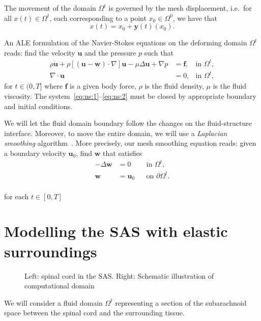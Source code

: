 \documentclass[11pt,a4paper,titlepage]{report}
\begin{document}
The movement of the domain $\Omega^t$ is governed by the mesh
displacement, i.e.~for all $x(t) \in \Omega^t$, each corresponding to
a point $x_0 \in \Omega^0$, we have that
\begin{equation}
  x(t) = x_0 + \mathbf{y}(t)(x_0).
\end{equation}

An ALE formulation of the Navier-Stokes equations on the deforming
domain $\Omega^t$ reads: find the velocity $\mathbf{u}$ and the
pressure $p$ such that
\begin{align}
  \label{eq:ns:1}
  \rho \dot{\mathbf{u}}
  + \rho [(\mathbf{u - w}) \cdot \nabla] \mathbf{u}
  - \mu \Delta \mathbf{u} + \nabla p
  &= \mathbf{f},  & \text{in } \Omega^t, \\
  \label{eq:ns:2}
  \nabla \cdot \mathbf{u} &= 0, & \text{in } \Omega^t,
\end{align}
for $t \in (0, T]$ where $\mathbf{f}$ is a given body force, $\rho$ is
  the fluid density, $\mu$ is the fluid viscosity. The
  system~\eqref{eq:ns:1}--\eqref{eq:ns:2} must be closed by
  appropriate boundary and initial conditions.

We will let the fluid domain boundary follow the changes on the
fluid-structure interface. Moreover, to move the entire domain, we
will use a \emph{Laplacian smoothing}
algorithm~\cite{Winslow1963}. More precisely, our mesh smoothing
equation reads: given a boundary velocity $\mathbf{u}_0$, find
$\mathbf{w}$ that satisfies
\begin{align}
\label{eq:bc:2}
- \Delta \mathbf{w} &= 0 	&& \text{in } \Omega^t, \\
\mathbf{w} &= \mathbf{u}_0 && \text{on } \partial \Omega^t .
\end{align}
\\
for each $t \in [0, T]$


\section{Modelling the SAS with elastic surroundings}

\begin{figure}
  \caption{Left: spinal cord in the SAS. Right: Schematic illustration
    of computational domain}
\end{figure}

We will consider a fluid domain $\Omega^t$ representing a section of
the subarachnoid space between the spinal cord and the surrounding
tissue.
\end{document}
